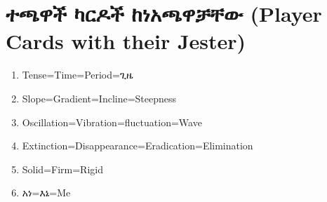 \documentclass[a4paper,12pt]{article}
\newenvironment{geez}{\geezfont}{}
\theoremstyle{mystyle}
\numberwithin{equation}{section}
\numberwithin{theorem}{section}
\numberwithin{proposition}{section}
\numberwithin{example}{section}
\numberwithin{remark}{section}
\numberwithin{lemma}{section}
\numberwithin{corollary}{section}
\numberwithin{definition}{section}
\numberwithin{amharicdefinition}{section}
\begin{document}
\section{\begin{geez}ተጫዋች ካርዶች ከነአጫዋቻቸው (Player Cards with their Jester)\end{geez}}
\label{S:3}
\begin{enumerate}
\item Tense=Time=Period=ጊዜ
\item Slope=Gradient=Incline=Steepness
\item Oscillation=Vibration=fluctuation=Wave
\item Extinction=Disappearance=Eradication=Elimination
\item Solid=Firm=Rigid
\item አነ=እኔ=Me
\end{enumerate}
\printbibliography
\end{document}
